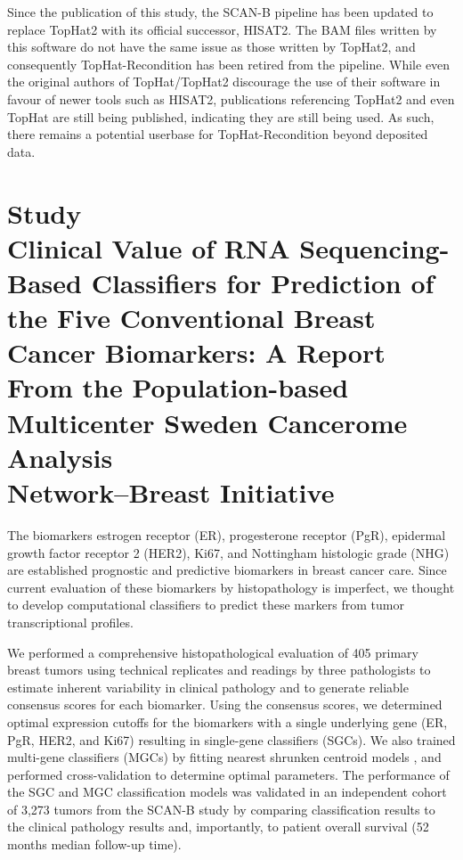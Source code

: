 \documentclass[11pt]{book}
\newcommand{\scanb}{\mbox{SCAN-B}}
\begin{document}
Since the publication of this study, the \scanb{} pipeline has been updated to replace \mbox{TopHat2} with its official successor, HISAT2. The BAM files written by this software do not have the same issue as those written by TopHat2, and consequently TopHat-Recondition has been retired from the pipeline. While even the original authors of TopHat/TopHat2 discourage the use of their software in favour of newer tools such as HISAT2, publications referencing TopHat2 and even TopHat are still being published, indicating they are still being used. As such, there remains a potential userbase for TopHat-Recondition beyond deposited data.


\section*{Study \III \\ Clinical Value of RNA Sequencing-Based Classifiers for Prediction of the Five Conventional Breast Cancer Biomarkers: A Report From the Population-based Multicenter Sweden Cancerome Analysis \\ Network--Breast Initiative}

The biomarkers estrogen receptor (ER), progesterone receptor (PgR), epidermal growth factor receptor 2 (HER2), Ki67, and Nottingham histologic grade (NHG) are established prognostic and predictive biomarkers in breast cancer care. Since current evaluation of these biomarkers by histopathology is imperfect, we thought to develop computational classifiers to predict these markers from tumor transcriptional profiles.

We performed a comprehensive histopathological evaluation of 405 primary breast tumors using technical replicates and readings by three pathologists to estimate inherent variability in clinical pathology and to generate reliable consensus scores for each biomarker. Using the consensus scores, we determined optimal expression cutoffs for the biomarkers with a single underlying gene (ER, PgR, HER2, and Ki67) resulting in single-gene classifiers (SGCs). We also trained multi-gene classifiers (MGCs) by fitting nearest shrunken centroid models \cite{Tibshirani:2002}, and performed cross-validation to determine optimal parameters. The performance of the SGC and MGC classification models was validated in an independent cohort of 3,273 tumors from the \scanb{} study by comparing classification results to the clinical pathology results and, importantly, to patient overall survival (52 months median follow-up time).
\end{document}
